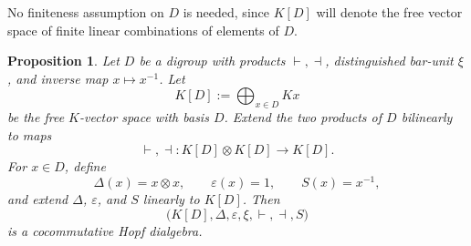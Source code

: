 \documentclass[11pt]{article}
\theoremstyle{plain}
\newtheorem{proposition}[theorem]{Proposition}
\theoremstyle{definition}
\theoremstyle{remark}
\begin{document}
	No finiteness assumption on \(D\) is needed, since \(K[D]\) will denote the free
	vector space of finite linear combinations of elements of \(D\).
	
	\begin{proposition}\label{prop:digroup-algebra-hopf-dialgebra}
		Let \(D\) be a digroup with products \(\vdash,\dashv\), distinguished
		bar-unit \(\xi\), and inverse map \(x\mapsto x^{-1}\). Let
		\[
		K[D]:=\bigoplus_{x\in D}Kx
		\]
		be the free \(K\)-vector space with basis \(D\). Extend the two products
		of \(D\) bilinearly to maps
		\[
		\vdash,\dashv:K[D]\otimes K[D]\longrightarrow K[D].
		\]
		For \(x\in D\), define
		\[
		\Delta(x)=x\otimes x,
		\qquad
		\varepsilon(x)=1,
		\qquad
		S(x)=x^{-1},
		\]
		and extend \(\Delta\), \(\varepsilon\), and \(S\) linearly to \(K[D]\).
		Then
		\[
		\bigl(K[D],\Delta,\varepsilon,\xi,\vdash,\dashv,S\bigr)
		\]
		is a cocommutative Hopf dialgebra.
	\end{proposition}
	
\end{document}
